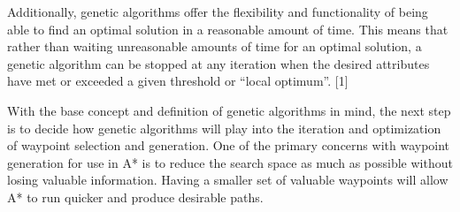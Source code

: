	Additionally, genetic algorithms offer the flexibility and functionality of being able to find an optimal solution in a reasonable amount of time. This means that rather than waiting unreasonable amounts of time for an optimal solution, a genetic algorithm can be stopped at any iteration when the desired attributes have met or exceeded a given threshold or “local optimum”. [1]
	
	With the base concept and definition of genetic algorithms in mind, the next step is to decide how genetic algorithms will play into the iteration and optimization of waypoint selection and generation. One of the primary concerns with waypoint generation for use in A* is to reduce the search space as much as possible without losing valuable information. Having a smaller set of valuable waypoints will allow A* to run quicker and produce desirable paths.
	